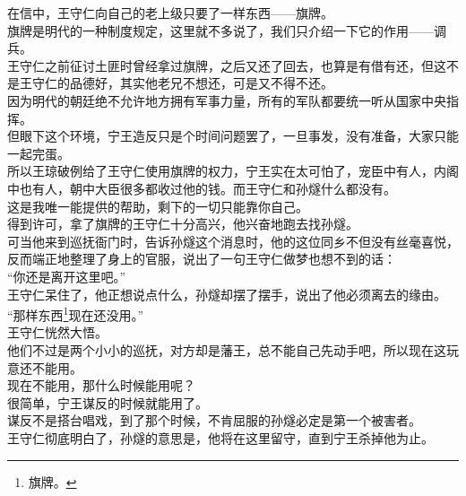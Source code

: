\begin{multicols}{\theparacolNo}
在信中，王守仁向自己的老上级只要了一样东西——旗牌。\\

旗牌是明代的一种制度规定，这里就不多说了，我们只介绍一下它的作用——调兵。\\

王守仁之前征讨土匪时曾经拿过旗牌，之后又还了回去，也算是有借有还，但这不是王守仁的品德好，其实他老兄不想还，可是又不得不还。\\

因为明代的朝廷绝不允许地方拥有军事力量，所有的军队都要统一听从国家中央指挥。\\

但眼下这个环境，宁王造反只是个时间问题罢了，一旦事发，没有准备，大家只能一起完蛋。\\

所以王琼破例给了王守仁使用旗牌的权力，宁王实在太可怕了，宠臣中有人，内阁中也有人，朝中大臣很多都收过他的钱。而王守仁和孙燧什么都没有。\\

这是我唯一能提供的帮助，剩下的一切只能靠你自己。\\

得到许可，拿了旗牌的王守仁十分高兴，他兴奋地跑去找孙燧。\\

可当他来到巡抚衙门时，告诉孙燧这个消息时，他的这位同乡不但没有丝毫喜悦，反而端正地整理了身上的官服，说出了一句王守仁做梦也想不到的话：\\

“你还是离开这里吧。”\\

王守仁呆住了，他正想说点什么，孙燧却摆了摆手，说出了他必须离去的缘由。\\

“那样东西\footnote{旗牌。}现在还没用。”\\

王守仁恍然大悟。\\

他们不过是两个小小的巡抚，对方却是藩王，总不能自己先动手吧，所以现在这玩意还不能用。\\

现在不能用，那什么时候能用呢？\\

很简单，宁王谋反的时候就能用了。\\

谋反不是搭台唱戏，到了那个时候，不肯屈服的孙燧必定是第一个被害者。\\

王守仁彻底明白了，孙燧的意思是，他将在这里留守，直到宁王杀掉他为止。\\


\end{multicols}
